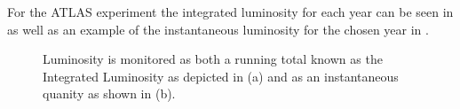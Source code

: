 For the ATLAS experiment the integrated luminosity for each year can be seen in
 as well as an example of the instantaneous luminosity for the chosen
year in .

\begin{figure}[!htbp] 
\centering
{}\hfill
{}\hfill
\caption{Luminosity is monitored as both a running total known as the Integrated
Luminosity as depicted in (a) and as an instantaneous quanity as shown in (b).}
\label{fig:luminosity} 
\end{figure}

